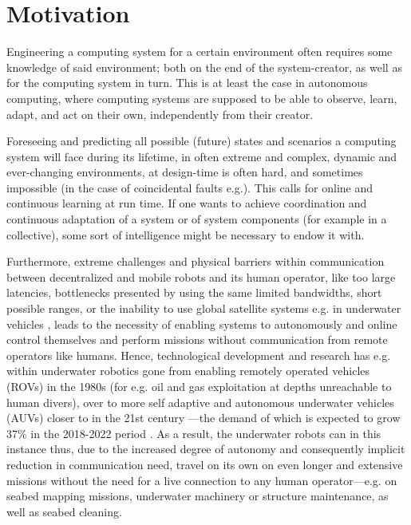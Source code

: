 \section{Motivation}


Engineering a computing system for a certain environment often requires some knowledge of said environment; both on the end of the system-creator, as well as for the computing system in turn. This is at least the case in autonomous computing, where computing systems are supposed to be able to observe, learn, adapt, and act on their own, independently from their creator.

Foreseeing and predicting all possible (future) states and scenarios a computing system will face during its lifetime, in often extreme and complex, dynamic and ever-changing environments, at design-time is often hard, and sometimes impossible (in the case of coincidental faults e.g.). This calls for online and continuous learning at run time. If one wants to achieve coordination and continuous adaptation of a system or of system components (for example in a collective), some sort of intelligence might be necessary to endow it with.

Furthermore, extreme challenges and physical barriers within communication between decentralized and mobile robots and its human operator, like too large latencies, bottlenecks presented by using the same limited bandwidths, short possible ranges, or the inability to use global satellite systems e.g. in underwater vehicles \cite{petillot_underwater_robots}, leads to the necessity of enabling systems to autonomously and online control themselves and perform missions without communication from remote operators like humans. Hence, technological development and research has e.g. within underwater robotics gone from enabling remotely operated vehicles (ROVs) in the 1980s (for e.g. oil and gas exploitation at depths unreachable to human divers), over to more self adaptive and autonomous underwater vehicles (AUVs) closer to in the 21st century —the demand of which is expected to grow 37\% in the 2018-2022 period \cite{petillot_underwater_robots}. As a result, the underwater robots can in this instance thus, due to the increased degree of autonomy and consequently implicit reduction in communication need, travel on its own on even longer and extensive missions without the need for a live connection to any human operator—e.g. on seabed mapping missions, underwater machinery or structure maintenance, as well as seabed cleaning.

